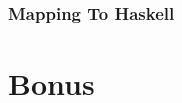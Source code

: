 \documentclass{beamer}
\begin{document}
 \begin{frame}
   \frametitle{Mapping To Haskell}
 \end{frame}
\appendix{}

\section*{Bonus}\label{sec:bonus}
\end{document}

